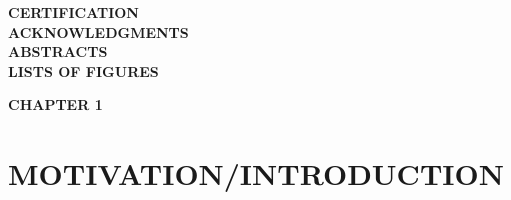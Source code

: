 \documentclass[10pt,a4paper]{article}
\begin{document}
\newpage
\begin{flushleft}
	\textbf{CERTIFICATION\\}
	\vspace{0.5 cm}
	\textbf{ACKNOWLEDGMENTS\\}
	\vspace{0.5 cm}
	\textbf{ABSTRACTS\\}
	\vspace{0.5 cm}
	\textbf{LISTS OF FIGURES\\}
	
\end{flushleft}
\tableofcontents 

\newpage
\centering \textbf {CHAPTER 1\\}
\vspace{1 cm}
\centering \section {MOTIVATION/INTRODUCTION}
\end{document}
